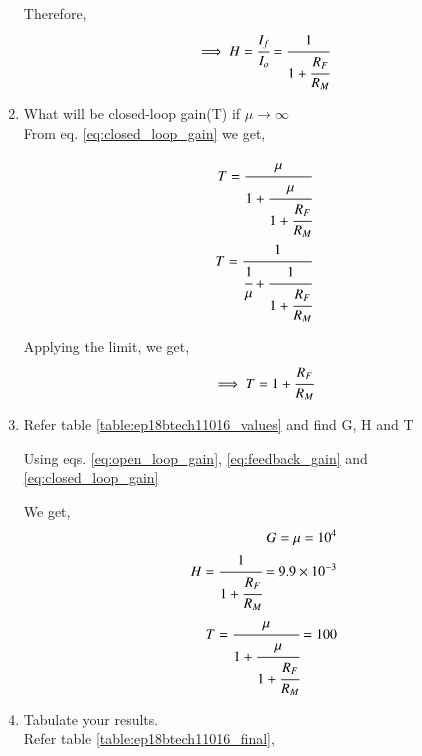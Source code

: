 \begin{enumerate}[label=\thesection.\arabic*.,ref=\thesection.\theenumi]
Therefore,
\begin{align}
    \implies H = \cfrac{I_f}{I_o} = \cfrac{ 1 }{1 + \cfrac{R_F}{R_M}}
    \label{eq:feedback_gain}
\end{align}


\item What will be closed-loop gain(T) if $\mu \to \infty$
\\
\solution From eq. \ref{eq:closed_loop_gain} we get,

\begin{align}
    T = \cfrac{\mu}{1 + \cfrac{\mu}{1 + \cfrac{R_F}{R_M}}}\\
    T = \cfrac{1}{\cfrac{1}{\mu} + \cfrac{1}{1 + \cfrac{R_F}{R_M}}}
\end{align}

Applying the limit, we get,
\begin{align}
    \implies T = 1 + \cfrac{R_F}{R_M}
\end{align}


\item Refer table \ref{table:ep18btech11016_values} and find G, H and T

\begin{table}[!ht]
    \centering
    
    \caption{}
    \label{table:ep18btech11016_values}
\end{table}

\solution Using eqs. \ref{eq:open_loop_gain}, \ref{eq:feedback_gain} and \ref{eq:closed_loop_gain}

We get,
\begin{align}
    G = \mu = 10^4\\
    H = \cfrac{ 1 }{1 + \cfrac{R_F}{R_M}} = 9.9 \times 10^{-3}\\
    T = \cfrac{\mu}{1 + \cfrac{\mu}{1 + \cfrac{R_F}{R_M}}} = 100
\end{align}


\item Tabulate your results.
\\
\solution Refer table \ref{table:ep18btech11016_final},

\begin{table}[!ht]
    \centering
    
    \caption{}
    \label{table:ep18btech11016_final}
\end{table}

\end{enumerate}